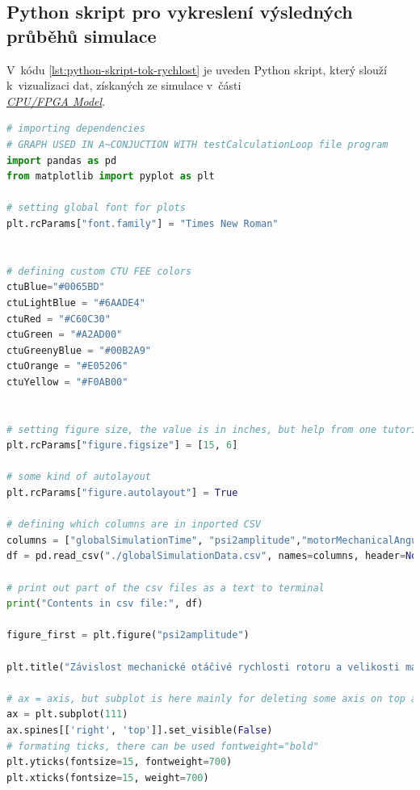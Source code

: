 \documentclass[a4paper, twoside, 11pt]{article}
\begin{document}
\begin{appendices}
	\section{Python skript pro vykreslení výsledných průběhů simulace}
	V~kódu \ref{lst:python-skript-tok-rychlost} je uveden Python skript, který slouží k~vizualizaci dat, získaných ze simulace v~části\\\hyperref[subsec:cpu-fpga]{\textit{CPU/FPGA Model}}.
	\begin{lstlisting}[language={python}, caption={Ukázka python skriptu pro vykreslení časové závislosti mechanické otáčivé rychlosti rotoru \gls{symbol:mechanicka-uhlova-rychlost} a velikosti magnetického toku rotoru \gls{symbol:psi2}.}, label={lst:python-skript-tok-rychlost}]
# importing dependencies
# GRAPH USED IN A~CONJUCTION WITH testCalculationLoop file program
import pandas as pd
from matplotlib import pyplot as plt

# setting global font for plots
plt.rcParams["font.family"] = "Times New Roman"


# defining custom CTU FEE colors
ctuBlue="#0065BD"
ctuLightBlue = "#6AADE4"
ctuRed = "#C60C30"
ctuGreen = "#A2AD00"
ctuGreenyBlue = "#00B2A9"
ctuOrange = "#E05206"
ctuYellow = "#F0AB00"


# setting figure size, the value is in inches, but help from one tutorial gives info, that because of dpi it translates to pixels like inches * 100 = pixels
plt.rcParams["figure.figsize"] = [15, 6]

# some kind of autolayout
plt.rcParams["figure.autolayout"] = True

# defining which columns are in inported CSV
columns = ["globalSimulationTime", "psi2amplitude","motorMechanicalAngularVelocity", "idRegulatorMeasuredValue", "idRegulatorWantedValue", "velocityRegulatorWantedValue", "velocityRegulatorSaturationOutput", "velocityRegulatorClampingStatus", "fluxRegulatorISum"]
df = pd.read_csv("./globalSimulationData.csv", names=columns, header=None, skiprows=0, nrows=10000000)

# print out part of the csv files as a text to terminal
print("Contents in csv file:", df)

figure_first = plt.figure("psi2amplitude")

plt.title("Závislost mechanické otáčivé rychlosti rotoru a velikosti magnetického toku rotoru na čase", fontsize=22, fontweight=700)

# ax = axis, but subplot is here mainly for deleting some axis on top and right
ax = plt.subplot(111)
ax.spines[['right', 'top']].set_visible(False)
# formating ticks, there can be used fontweight="bold"
plt.yticks(fontsize=15, fontweight=700)
plt.xticks(fontsize=15, weight=700)


\end{lstlisting}
\end{appendices}
\end{document}
